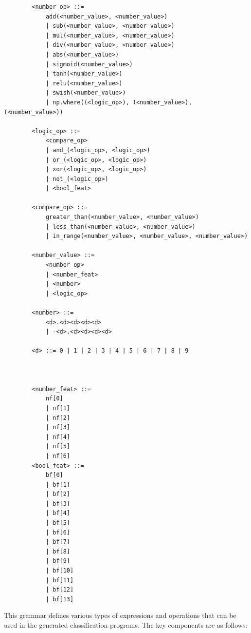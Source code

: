\documentclass{article}
\begin{document}
    \begin{verbatim}
        <number_op> ::= 
            add(<number_value>, <number_value>)
            | sub(<number_value>, <number_value>)
            | mul(<number_value>, <number_value>)
            | div(<number_value>, <number_value>) 
            | abs(<number_value>)
            | sigmoid(<number_value>)
            | tanh(<number_value>)
            | relu(<number_value>)
            | swish(<number_value>)
            | np.where((<logic_op>), (<number_value>), (<number_value>))

        <logic_op> ::= 
            <compare_op>
            | and_(<logic_op>, <logic_op>)
            | or_(<logic_op>, <logic_op>)
            | xor(<logic_op>, <logic_op>)
            | not_(<logic_op>)
            | <bool_feat>

        <compare_op> ::=
            greater_than(<number_value>, <number_value>)
            | less_than(<number_value>, <number_value>)
            | in_range(<number_value>, <number_value>, <number_value>)

        <number_value> ::=
            <number_op>
            | <number_feat>
            | <number>
            | <logic_op>

        <number> ::= 
            <d>.<d><d><d><d>
            | -<d>.<d><d><d><d>

        <d> ::= 0 | 1 | 2 | 3 | 4 | 5 | 6 | 7 | 8 | 9



        <number_feat> ::= 
            nf[0]
            | nf[1]
            | nf[2]
            | nf[3]
            | nf[4]
            | nf[5]
            | nf[6]
        <bool_feat> ::= 
            bf[0]
            | bf[1]
            | bf[2]
            | bf[3]
            | bf[4]
            | bf[5]
            | bf[6]
            | bf[7]
            | bf[8]
            | bf[9]
            | bf[10]
            | bf[11]
            | bf[12]
            | bf[13]
    \end{verbatim}

    This grammar defines various types of expressions and operations that can be used in the generated classification programs. The key components are as follows:
\end{document}
